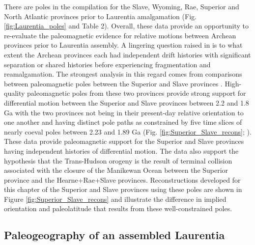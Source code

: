 \documentclass[twocolumn, switch]{article} %
\begin{document}
There are poles in the compilation for the Slave, Wyoming, Rae, Superior and North Atlantic provinces prior to Laurentia amalgamation (Fig. \ref{fig:Laurentia_poles} and Table 2). Overall, these data provide an opportunity to re-evaluate the paleomagnetic evidence for relative motions between Archean provinces prior to Laurentia assembly. A lingering question raised in \citet{Hoffman1988a} is to what extent the Archean provinces each had independent drift histories with significant separation or shared histories before experiencing fragmentation and reamalgamation. The strongest analysis in this regard comes from comparisons between paleomagnetic poles between the Superior and Slave provinces \citep{Buchan2009a, Mitchell2014a, Buchan2016a}. High-quality paleomagnetic poles from these two provinces provide strong support for differential motion between the Superior and Slave provinces between 2.2 and 1.8 Ga with the two provinces not being in their present-day relative orientation to one another and having distinct pole paths as constrained by five time slices of nearly coeval poles between 2.23 and 1.89 Ga (Fig. \ref{fig:Superior_Slave_recons}; \citealp{Buchan2016a}). These data provide paleomagnetic support for the Superior and Slave provinces having independent histories of differential motion. The data also support the hypothesis that the Trans-Hudson orogeny is the result of terminal collision associated with the closure of the Manikewan Ocean between the Superior province and the Hearne+Rae+Slave provinces. Reconstructions developed for this chapter of the Superior and Slave provinces using these poles are shown in Figure \ref{fig:Superior_Slave_recons} and illustrate the difference in implied orientation and paleolatitude that results from these well-constrained poles.

\subsection{Paleogeography of an assembled Laurentia}
\end{document}
